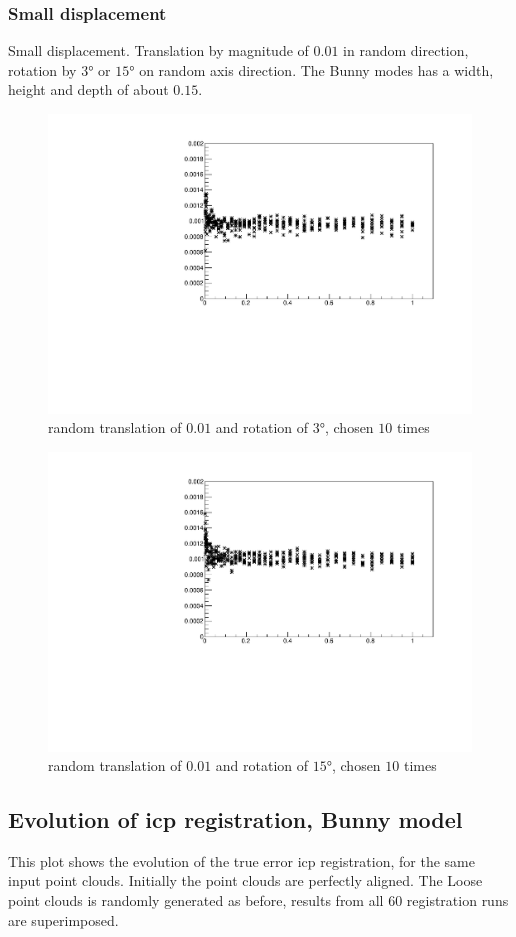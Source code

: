 \subsubsection{Small displacement}
Small displacement. Translation by magnitude of $0.01$ in random direction, rotation by $3 \si{\degree}$ or $15 \si{\degree}$ on random axis direction. The Bunny modes has a width, height and depth of about $0.15$.

\begin{figure}[H]
\centering
\includegraphics[width=.7\textwidth]{fig/bunny_globsmall.pdf}
\caption{random translation of $0.01$ and rotation of $3 \si{\degree}$, chosen $10$ times}
\label{fig:bunny_globsmall}
\end{figure}

\begin{figure}[H]
\centering
\includegraphics[width=.7\textwidth]{fig/bunny_globmed.pdf}
\caption{random translation of $0.01$ and rotation of $15 \si{\degree}$, chosen $10$ times}
\label{fig:bunny_globmed}
\end{figure}

\subsection{Evolution of \gls{icp} registration, Bunny model}
This plot shows the evolution of the true error \gls{icp} registration, for the same input point clouds. Initially the point clouds are perfectly aligned. The Loose point clouds is randomly generated as before, results from all $60$ registration runs are superimposed.

